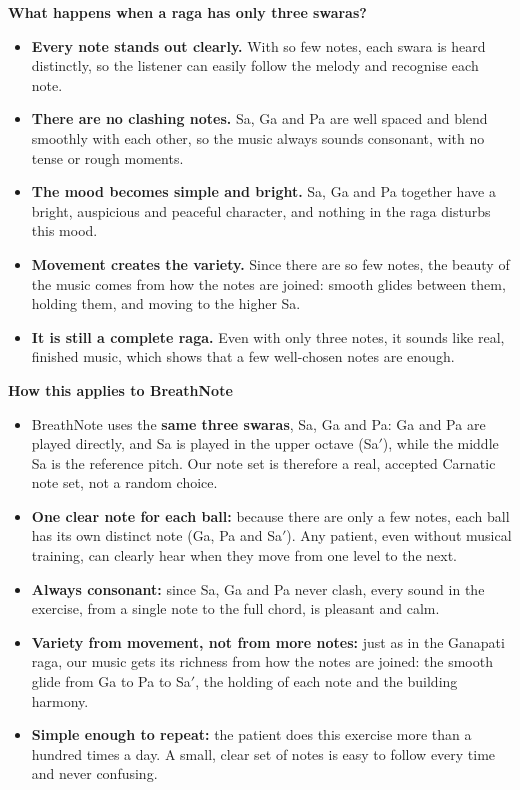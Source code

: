 \documentclass[12pt,a4paper]{article}
\newcommand{\Sah}{Sa\ensuremath{'}}     %
\begin{document}
\textbf{What happens when a raga has only three swaras?}
\begin{itemize}
  \item \textbf{Every note stands out clearly.} With so few notes, each swara is heard distinctly, so the listener can easily follow the melody and recognise each note.
  \item \textbf{There are no clashing notes.} Sa, Ga and Pa are well spaced and blend smoothly with each other, so the music always sounds consonant, with no tense or rough moments.
  \item \textbf{The mood becomes simple and bright.} Sa, Ga and Pa together have a bright, auspicious and peaceful character, and nothing in the raga disturbs this mood.
  \item \textbf{Movement creates the variety.} Since there are so few notes, the beauty of the music comes from how the notes are joined: smooth glides between them, holding them, and moving to the higher Sa.
  \item \textbf{It is still a complete raga.} Even with only three notes, it sounds like real, finished music, which shows that a few well-chosen notes are enough.
\end{itemize}

\textbf{How this applies to BreathNote}
\begin{itemize}
  \item BreathNote uses the \textbf{same three swaras}, Sa, Ga and Pa: Ga and Pa are played directly, and Sa is played in the upper octave (\Sah), while the middle Sa is the reference pitch. Our note set is therefore a real, accepted Carnatic note set, not a random choice.
  \item \textbf{One clear note for each ball:} because there are only a few notes, each ball has its own distinct note (Ga, Pa and \Sah). Any patient, even without musical training, can clearly hear when they move from one level to the next.
  \item \textbf{Always consonant:} since Sa, Ga and Pa never clash, every sound in the exercise, from a single note to the full chord, is pleasant and calm.
  \item \textbf{Variety from movement, not from more notes:} just as in the Ganapati raga, our music gets its richness from how the notes are joined: the smooth glide from Ga to Pa to \Sah, the holding of each note and the building harmony.
  \item \textbf{Simple enough to repeat:} the patient does this exercise more than a hundred times a day. A small, clear set of notes is easy to follow every time and never confusing.
\end{itemize}
\end{document}
